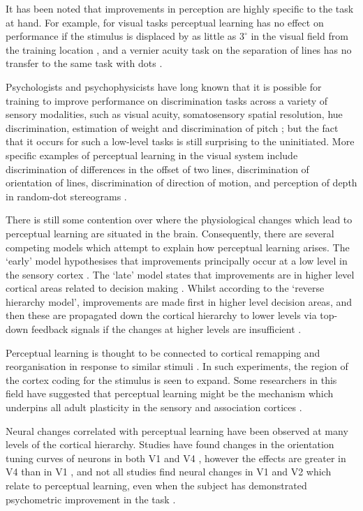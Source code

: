 It has been noted that improvements in perception are highly specific to the task at hand. For example, for visual tasks perceptual learning has no effect on performance if the stimulus is displaced by as little as $3^\circ$ in the visual field from the training location \cite{Gilbert1994}, 
and a vernier acuity task on the separation of lines has no transfer to the same task with dots \cite{Poggio1992}.


Psychologists and psychophysicists have long known that it is possible for training to improve performance on discrimination tasks across a variety of sensory modalities, such as visual acuity, somatosensory spatial resolution, hue discrimination, estimation of weight and discrimination of pitch \cite{Gilbert2001}; but the fact that it occurs for such a low-level tasks is still surprising to the uninitiated. More specific examples of perceptual learning in the visual system include discrimination of differences in the offset of two lines, discrimination of orientation of lines, discrimination of direction of motion, and perception of depth in random-dot stereograms \cite{Gilbert2001,Fine2002}.

There is still some contention over where the physiological changes which lead to perceptual learning are situated in the brain. Consequently, there are several competing models which attempt to explain how perceptual learning arises.
The `early' model hypothesises that improvements principally occur at a low level in the sensory cortex \cite{Gilbert2001,Fahle2005}.
The `late' model states that improvements are in higher level cortical areas related to decision making \cite{Yu2004}.
Whilst according to the `reverse hierarchy model', improvements are made first in higher level decision areas, and then these are propagated down the cortical hierarchy to lower levels via top-down feedback signals if the changes at higher levels are insufficient \cite{Ahissar2004,Hochstein2002}.

Perceptual learning is thought to be connected to cortical remapping and reorganisation in response to similar stimuli \cite{Dinse2003,Pleger2003,Polley2006}. In such experiments, the region of the cortex coding for the stimulus is seen to expand.
Some researchers in this field have suggested that perceptual learning might be the mechanism which underpins all adult plasticity in the sensory and association cortices \cite{Gilbert2001}.


Neural changes correlated with perceptual learning have been observed at many levels of the cortical hierarchy. Studies have found changes in the orientation tuning curves of neurons in both V1 \cite{Schoups2001} and V4 \cite{Yang2004,Raiguel2006}, however the effects are greater in V4 than in V1 \cite{Raiguel2006}, and not all studies find neural changes in V1 and V2 which relate to perceptual learning, even when the subject has demonstrated psychometric improvement in the task \cite{Ghose2002}.


